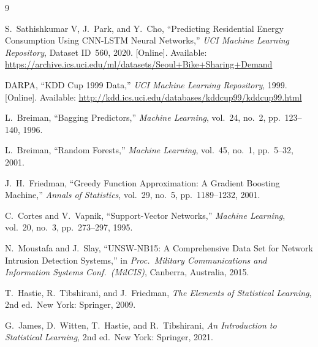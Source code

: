\documentclass[conference]{IEEEtran}
\begin{document}
\begin{thebibliography}{9}

S.\ Sathishkumar V, J.\ Park, and Y.\ Cho,
``Predicting Residential Energy Consumption Using CNN-LSTM Neural Networks,''
\textit{UCI Machine Learning Repository}, Dataset ID~560, 2020.
[Online]. Available: \url{https://archive.ics.uci.edu/ml/datasets/Seoul+Bike+Sharing+Demand}

DARPA, ``KDD Cup 1999 Data,''
\textit{UCI Machine Learning Repository}, 1999.
[Online]. Available: \url{http://kdd.ics.uci.edu/databases/kddcup99/kddcup99.html}

L.\ Breiman, ``Bagging Predictors,''
\textit{Machine Learning}, vol.\ 24, no.\ 2, pp.\ 123--140, 1996.

L.\ Breiman, ``Random Forests,''
\textit{Machine Learning}, vol.\ 45, no.\ 1, pp.\ 5--32, 2001.

J.\ H.\ Friedman, ``Greedy Function Approximation: A Gradient Boosting Machine,''
\textit{Annals of Statistics}, vol.\ 29, no.\ 5, pp.\ 1189--1232, 2001.

C.\ Cortes and V.\ Vapnik, ``Support-Vector Networks,''
\textit{Machine Learning}, vol.\ 20, no.\ 3, pp.\ 273--297, 1995.

N.\ Moustafa and J.\ Slay, ``UNSW-NB15: A Comprehensive Data Set for Network
Intrusion Detection Systems,'' in \textit{Proc.\ Military Communications and
Information Systems Conf.\ (MilCIS)}, Canberra, Australia, 2015.

T.\ Hastie, R.\ Tibshirani, and J.\ Friedman,
\textit{The Elements of Statistical Learning}, 2nd ed.\
New York: Springer, 2009.

G.\ James, D.\ Witten, T.\ Hastie, and R.\ Tibshirani,
\textit{An Introduction to Statistical Learning}, 2nd ed.\
New York: Springer, 2021.

\end{thebibliography}
\end{document}
